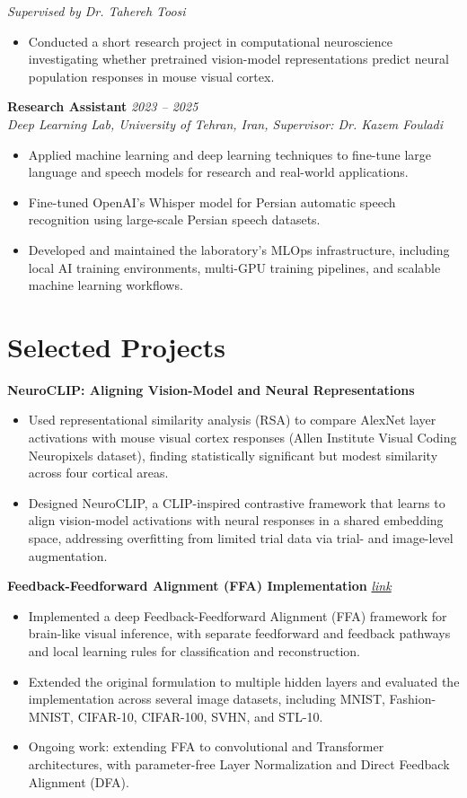 \documentclass[10.5pt, letterpaper]{article}
\newcommand{\cvEntrySimple}[2]{
  \noindent\textbf{#1} \hfill \textit{#2}\\
}
\begin{document}
\textit{Supervised by Dr. Tahereh Toosi}

\begin{itemize}
    \item Conducted a short research project in computational neuroscience investigating whether pretrained vision-model representations predict neural population responses in mouse visual cortex.
\end{itemize}

\cvEntrySimple{Research Assistant}{2023 -- 2025}
\textit{Deep Learning Lab, University of Tehran, Iran, Supervisor: Dr. Kazem Fouladi}
\begin{itemize}
    \item Applied machine learning and deep learning techniques to fine-tune large language and speech models for research and real-world applications.
    \item Fine-tuned OpenAI's Whisper model for Persian automatic speech recognition using large-scale Persian speech datasets.
    \item Developed and maintained the laboratory's MLOps infrastructure, including local AI training environments, multi-GPU training pipelines, and scalable machine learning workflows.
\end{itemize}

\section{Selected Projects}

\textbf{NeuroCLIP: Aligning Vision-Model and Neural Representations}
\begin{itemize}
    \item Used representational similarity analysis (RSA) to compare AlexNet layer activations with mouse visual cortex responses (Allen Institute Visual Coding Neuropixels dataset), finding statistically significant but modest similarity across four cortical areas.
    \item Designed NeuroCLIP, a CLIP-inspired contrastive framework that learns to align vision-model activations with neural responses in a shared embedding space, addressing overfitting from limited trial data via trial- and image-level augmentation.
\end{itemize}

\textbf{Feedback-Feedforward Alignment (FFA) Implementation} \href{https://github.com/0ahmadi/feedback-feedforward-alignment-implementation}{\textit{link}}
\begin{itemize}
\item Implemented a deep Feedback-Feedforward Alignment (FFA) framework for brain-like visual inference, with separate feedforward and feedback pathways and local learning rules for classification and reconstruction.
\item Extended the original formulation to multiple hidden layers and evaluated the implementation across several image datasets, including MNIST, Fashion-MNIST, CIFAR-10, CIFAR-100, SVHN, and STL-10.
\item Ongoing work: extending FFA to convolutional and Transformer architectures, with parameter-free Layer Normalization and Direct Feedback Alignment (DFA).
\end{itemize}
\end{document}
